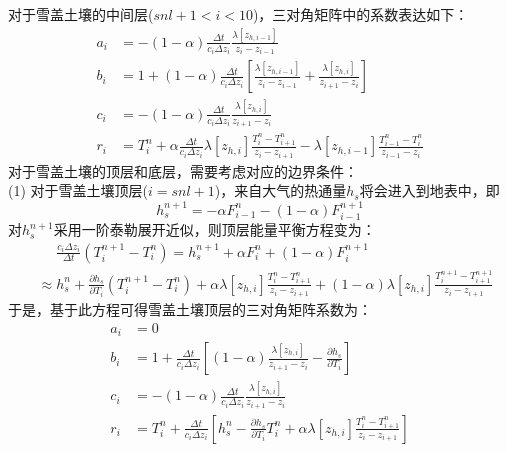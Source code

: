 对于雪盖土壤的中间层($snl+1<i<10$)，三对角矩阵中的系数表达如下：
\begin{equation}
\begin{aligned}
a_{i} &= -(1-\alpha) \frac{\Delta t}{c_{i} \Delta z_{i}} \frac{\lambda\left[z_{h, i-1}\right]}{z_{i}-z_{i-1}} \\[1ex] 
b_{i} &= 1+(1-\alpha) \frac{\Delta t}{c_{i} \Delta z_{i}}\left[\frac{\lambda\left[z_{h, i-1}\right]}{z_{i}-z_{i-1}}+\frac{\lambda\left[z_{h, i}\right]}{z_{i+1}-z_{i}}\right] \\[1ex] 
c_{i} &= -(1-\alpha) \frac{\Delta t}{c_{i} \Delta z_{i}} \frac{\lambda\left[z_{h, i}\right]}{z_{i+1}-z_{i}} \\[1ex]
r_{i} &= T_{i}^{n}+\alpha \frac{\Delta t}{c_{i} \Delta z_{i}} \lambda\left[z_{h, i}\right] \frac{T_{i}^{n}-T_{i+1}^{n}}{z_{i}-z_{i+1}}-\lambda\left[z_{h, i-1}\right] \frac{T_{i-1}^{n}-T_{i}^{n}}{z_{i-1}-z_{i}}
\end{aligned}
\end{equation}
对于雪盖土壤的顶层和底层，需要考虑对应的边界条件：\\
(1) 对于雪盖土壤顶层($i=snl+1$)，来自大气的热通量$h_s$将会进入到地表中，即
\begin{equation}
h_{s}^{n+1}=-\alpha F_{i-1}^{n}-(1-\alpha) F_{i-1}^{n+1}
\end{equation}
对$h_s^{n+1}$采用一阶泰勒展开近似，则顶层能量平衡方程变为：
\begin{equation}
\begin{split}
&\mathrel{\phantom{\approx}}\frac{c_{i} \Delta z_{i}}{\Delta t}\left(T_{i}^{n+1}-T_{i}^{n}\right)=h_{s}^{n+1}+\alpha F_{i}^{n}+(1-\alpha) F_{i}^{n+1} \\[1ex] 
&\approx h_{s}^{n}+\frac{\partial h_{s}}{\partial T_{i}}\left(T_{i}^{n+1}-T_{i}^{n}\right)+\alpha \lambda\left[z_{h, i}\right] \frac{T_{i}^{n}-T_{i+1}^{n}}{z_{i}-z_{i+1}}+(1-\alpha) \lambda\left[z_{h, i}\right] \frac{T_{i}^{n+1}-T_{i+1}^{n+1}}{z_{i}-z_{i+1}}
\end{split}
\end{equation}
于是，基于此方程可得雪盖土壤顶层的三对角矩阵系数为：
\begin{equation}
\begin{aligned}
a_{i} &= 0 \\ 
b_{i} &= 1+\frac{\Delta t}{c_{i} \Delta z_{i}}\left[(1-\alpha) \frac{\lambda\left[z_{h, i}\right]}{z_{i+1}-z_{i}}-\frac{\partial h_{s}}{\partial T_{i}}\right] \\[1ex]
c_{i} &= -(1-\alpha) \frac{\Delta t}{c_{i} \Delta z_{i}} \frac{\lambda\left[z_{h, i}\right]}{z_{i+1}-z_{i}} \\[1ex]
r_{i} &= T_{i}^{n}+\frac{\Delta t}{c_{i} \Delta z_{i}}\left[h_{s}^{n}-\frac{\partial h_{s}}{\partial T_{i}} T_{i}^{n}+\alpha \lambda\left[z_{h, i}\right] \frac{T_{i}^{n}-T_{i+1}^{n}}{z_{i}-z_{i+1}}\right]
\end{aligned}
\end{equation}
